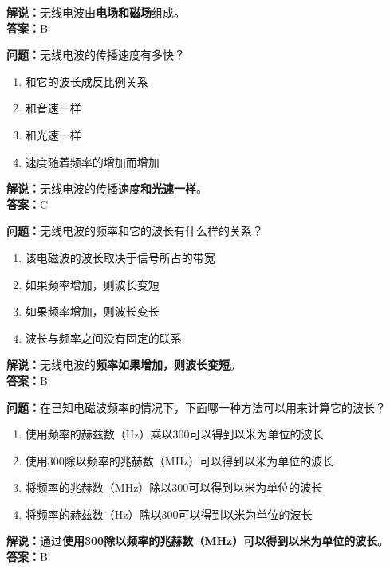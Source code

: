 \textbf{解说：}无线电波由\textbf{电场和磁场}组成。\\\textbf{答案：}B



\textbf{问题：}无线电波的传播速度有多快？

\begin{enumerate}[label=\Alph*), leftmargin=1.5cm]
	\item 和它的波长成反比例关系
	\item 和音速一样
	\item 和光速一样
	\item 速度随着频率的增加而增加
\end{enumerate}

\textbf{解说：}无线电波的传播速度\textbf{和光速一样}。\\\textbf{答案：}C



\textbf{问题：}无线电波的频率和它的波长有什么样的关系？

\begin{enumerate}[label=\Alph*), leftmargin=1.5cm]
	\item 该电磁波的波长取决于信号所占的带宽
	\item 如果频率增加，则波长变短
	\item 如果频率增加，则波长变长
	\item 波长与频率之间没有固定的联系
\end{enumerate}

\textbf{解说：}无线电波的\textbf{频率如果增加，则波长变短}。\\\textbf{答案：}B



\textbf{问题：}在已知电磁波频率的情况下，下面哪一种方法可以用来计算它的波长？

\begin{enumerate}[label=\Alph*), leftmargin=1.5cm]
	\item 使用频率的赫兹数（Hz）乘以300可以得到以米为单位的波长
	\item 使用300除以频率的兆赫数（MHz）可以得到以米为单位的波长
	\item 将频率的兆赫数（MHz）除以300可以得到以米为单位的波长
	\item 将频率的赫兹数（Hz）除以300可以得到以米为单位的波长
\end{enumerate}

\textbf{解说：}通过\textbf{使用300除以频率的兆赫数（MHz）可以得到以米为单位的波长}。\\\textbf{答案：}B



